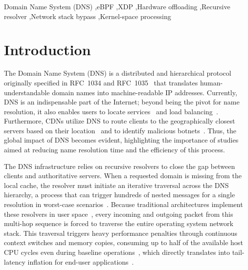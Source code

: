 \documentclass[a4paper,fleqn,colorlinks,hidelinks]{cas-sc}
\begin{document}
\begin{keywords}
Domain Name System (DNS) \sep eBPF \sep XDP \sep Hardware offloading \sep Recursive resolver \sep Network stack bypass \sep Kernel-space processing
\end{keywords}


\maketitle


\section{Introduction}

The Domain Name System (DNS) is a distributed and hierarchical protocol originally specified in RFC~1034 and RFC~1035~\citep{mockapetris1987domain, rfc1035} that translates human-understandable domain names into machine-readable IP addresses. Currently, DNS is an indispensable part of the Internet; beyond being the pivot for name resolution, it also enables users to locate services~\citep{cheshire2013dns} and load balancing~\citep{brisco1995dns}. Furthermore, CDNs utilize DNS to route clients to the geographically closest servers based on their location~\citep{hours2016study} and to identify malicious botnets~\citep{choi2007botnet}. Thus, the global impact of DNS becomes evident, highlighting the importance of studies aimed at reducing name resolution time and the efficiency of this process.

The DNS infrastructure relies on recursive resolvers to close the gap between clients and authoritative servers. When a requested domain is missing from the local cache, the resolver must initiate an iterative traversal across the DNS hierarchy, a process that can trigger hundreds of nested messages for a single resolution in worst-case scenarios~\citep{afek2020nxnsattack}. Because traditional architectures implement these resolvers in user space~\citep{6932501}, every incoming and outgoing packet from this multi-hop sequence is forced to traverse the entire operating system network stack. This traversal triggers heavy performance penalties through continuous context switches and memory copies, consuming up to half of the available host CPU cycles even during baseline operations~\citep{10.1145/3672197.3673439}, which directly translates into tail-latency inflation for end-user applications~\citep{singla2014internet}.
\end{document}
